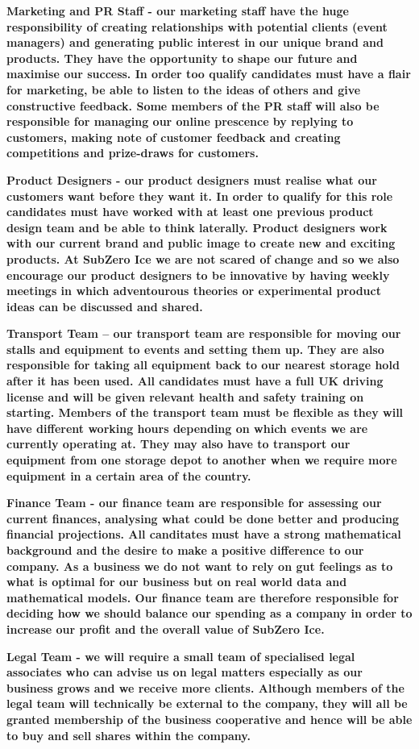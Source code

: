 \documentclass{article}
\begin{document}
 \bf{Marketing and PR Staff} - our marketing staff have the huge responsibility of creating relationships with potential clients (event managers) and generating public interest in our unique brand and products. They have the opportunity to shape our future and maximise our success. In order too qualify candidates must have a flair for marketing, be able to listen to the ideas of others and give constructive feedback. Some members of the PR staff will also be responsible for managing our online prescence by replying to customers, making note of customer feedback and creating competitions and prize-draws for customers.

\bf{Product Designers} - our product designers must realise what our customers want before they want it. In order to qualify for this role candidates must have worked with at least one previous product design team and be able to think laterally. Product designers work with our current brand and public image to create new and exciting products. At SubZero Ice we are not scared of change and so we also encourage our product designers to be innovative by having weekly meetings in which adventourous theories or experimental product ideas can be discussed and shared.

\bf{Transport Team} – our transport team are responsible for moving our stalls and equipment to events and setting them up. They are also responsible for taking all equipment back to our nearest storage hold after it has been used. All candidates must have a full UK driving license and will be given relevant health and safety training on starting. Members of the transport team must be flexible as they will have different working hours depending on which events we are currently operating at. They may also have to transport our equipment from one storage depot to another when we require more equipment in a certain area of the country.

 \bf{Finance Team} - our finance team are responsible for assessing our current finances, analysing what could be done better and producing financial projections. All canditates must have a strong mathematical background and the desire to make a positive difference to our company. As a business we do not want to rely on gut feelings as to what is optimal for our business but on real world data and mathematical models. Our finance team are therefore responsible for deciding how we should balance our spending as a company in order to increase our profit and the overall value of SubZero Ice.

 \bf{Legal Team} - we will require a small team of specialised legal associates who can advise us on legal matters especially as our business grows and we receive more clients. Although members of the legal team will technically be external to the company, they will all be granted membership of the business cooperative and hence will be able to buy and sell shares within the company.
\end{document}

